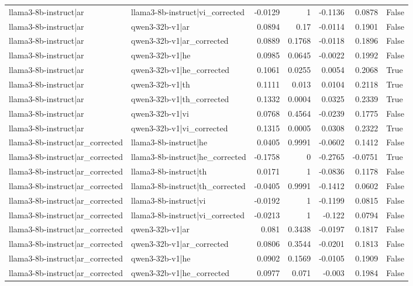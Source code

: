 \begin{table}
\begin{tabular}{l l r r r r l}
llama3-8b-instruct|ar & llama3-8b-instruct|vi_corrected & -0.0129 & 1 & -0.1136 & 0.0878 & False \\
llama3-8b-instruct|ar & qwen3-32b-v1|ar & 0.0894 & 0.17 & -0.0114 & 0.1901 & False \\
llama3-8b-instruct|ar & qwen3-32b-v1|ar_corrected & 0.0889 & 0.1768 & -0.0118 & 0.1896 & False \\
llama3-8b-instruct|ar & qwen3-32b-v1|he & 0.0985 & 0.0645 & -0.0022 & 0.1992 & False \\
llama3-8b-instruct|ar & qwen3-32b-v1|he_corrected & 0.1061 & 0.0255 & 0.0054 & 0.2068 & True \\
llama3-8b-instruct|ar & qwen3-32b-v1|th & 0.1111 & 0.013 & 0.0104 & 0.2118 & True \\
llama3-8b-instruct|ar & qwen3-32b-v1|th_corrected & 0.1332 & 0.0004 & 0.0325 & 0.2339 & True \\
llama3-8b-instruct|ar & qwen3-32b-v1|vi & 0.0768 & 0.4564 & -0.0239 & 0.1775 & False \\
llama3-8b-instruct|ar & qwen3-32b-v1|vi_corrected & 0.1315 & 0.0005 & 0.0308 & 0.2322 & True \\
llama3-8b-instruct|ar_corrected & llama3-8b-instruct|he & 0.0405 & 0.9991 & -0.0602 & 0.1412 & False \\
llama3-8b-instruct|ar_corrected & llama3-8b-instruct|he_corrected & -0.1758 & 0 & -0.2765 & -0.0751 & True \\
llama3-8b-instruct|ar_corrected & llama3-8b-instruct|th & 0.0171 & 1 & -0.0836 & 0.1178 & False \\
llama3-8b-instruct|ar_corrected & llama3-8b-instruct|th_corrected & -0.0405 & 0.9991 & -0.1412 & 0.0602 & False \\
llama3-8b-instruct|ar_corrected & llama3-8b-instruct|vi & -0.0192 & 1 & -0.1199 & 0.0815 & False \\
llama3-8b-instruct|ar_corrected & llama3-8b-instruct|vi_corrected & -0.0213 & 1 & -0.122 & 0.0794 & False \\
llama3-8b-instruct|ar_corrected & qwen3-32b-v1|ar & 0.081 & 0.3438 & -0.0197 & 0.1817 & False \\
llama3-8b-instruct|ar_corrected & qwen3-32b-v1|ar_corrected & 0.0806 & 0.3544 & -0.0201 & 0.1813 & False \\
llama3-8b-instruct|ar_corrected & qwen3-32b-v1|he & 0.0902 & 0.1569 & -0.0105 & 0.1909 & False \\
llama3-8b-instruct|ar_corrected & qwen3-32b-v1|he_corrected & 0.0977 & 0.071 & -0.003 & 0.1984 & False \\

\end{tabular}
\end{table}
